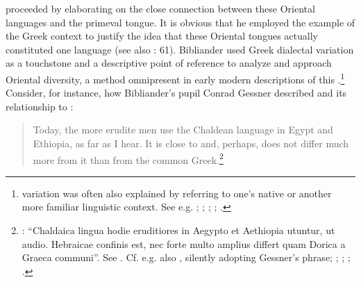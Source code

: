 \citet[58--59]{Bibliander1542} proceeded by elaborating on the close connection between these Oriental languages and the primeval  tongue. It is obvious that he employed the example of the Greek context to justify the idea that these Oriental tongues actually constituted one language (see also \citealt{Metcalf2013}: 61). Bibliander used Greek dialectal variation as a touchstone and a descriptive point of reference to analyze and approach Oriental diversity, a method omnipresent in early modern descriptions of this .\footnote{ variation was often also explained by referring to one’s native or another more familiar linguistic context. See e.g. \citet[41]{Purchas1613}; \citet[197]{Kircher1679}; \citet[b.1\textsc{\textsuperscript{v}}]{Le1696}; \citet[\textsc{i.}230, 4th sequence of pagination]{Chambers1728}; \citet[57--58]{Kals1752}.} Consider, for instance, how Bibliander’s pupil Conrad Gessner described  and its relationship to :

\begin{quote}
Today, the more erudite men use the Chaldean language in Egypt and Ethiopia, as far as I hear. It is close to  and, perhaps, does not differ much more from it than  from the common Greek.\footnote{\citet[15\textsc{\textsuperscript{r}}]{Gessner1555}: “Chaldaica lingua hodie eruditiores in Aegypto et Aethiopia utuntur, ut audio. Hebraicae confinis est, nec forte multo amplius differt quam Dorica a Graeca communi”. See \citet[43]{Peters1970}. Cf. e.g. also \citet[325]{Rocca1591}, silently adopting Gessner’s phrase; \citet[459]{Saumaise1643a}; \citet[88]{Bagnati1732}; \citet[24]{Wesley1736}; \citet[22]{Eichhorn1780}.}
\end{quote}

